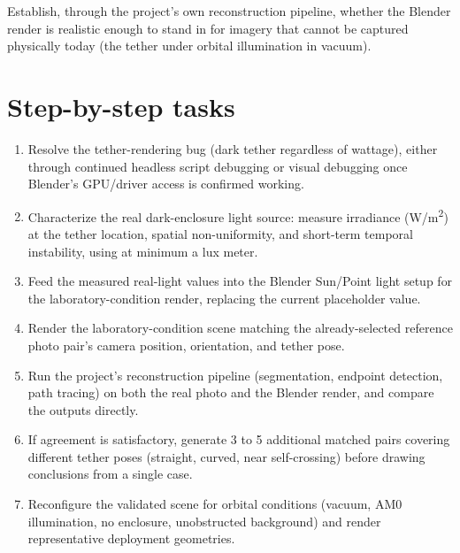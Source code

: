 Establish, through the project's own reconstruction pipeline, whether the Blender render is realistic enough to stand in for imagery that cannot be captured physically today (the tether under orbital illumination in vacuum).

\section{Step-by-step tasks}

\begin{enumerate}[leftmargin=*]
    \item Resolve the tether-rendering bug (dark tether regardless of wattage), either through continued headless script debugging or visual debugging once Blender's GPU/driver access is confirmed working.
    \item Characterize the real dark-enclosure light source: measure irradiance (W/m\textsuperscript{2}) at the tether location, spatial non-uniformity, and short-term temporal instability, using at minimum a lux meter.
    \item Feed the measured real-light values into the Blender Sun/Point light setup for the laboratory-condition render, replacing the current placeholder value.
    \item Render the laboratory-condition scene matching the already-selected reference photo pair's camera position, orientation, and tether pose.
    \item Run the project's reconstruction pipeline (segmentation, endpoint detection, path tracing) on both the real photo and the Blender render, and compare the outputs directly.
    \item If agreement is satisfactory, generate 3 to 5 additional matched pairs covering different tether poses (straight, curved, near self-crossing) before drawing conclusions from a single case.
    \item Reconfigure the validated scene for orbital conditions (vacuum, AM0 illumination, no enclosure, unobstructed background) and render representative deployment geometries.
\end{enumerate}

